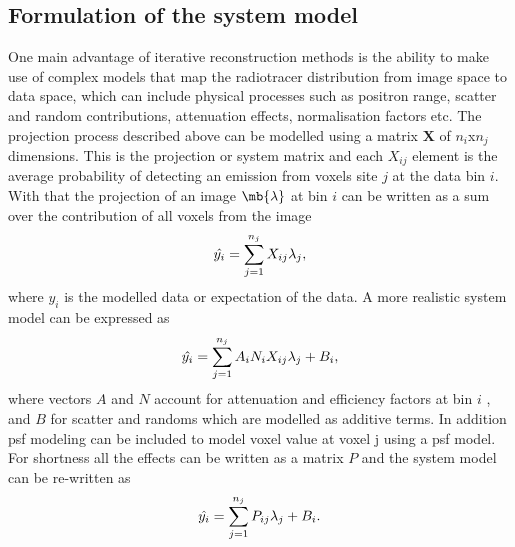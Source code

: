 \subsection{Formulation of the system model}
One main advantage of iterative reconstruction methods is the ability to make use of complex models that map the radiotracer distribution from image space to data space, which can include physical processes such as positron range, scatter and random contributions, attenuation effects, normalisation factors etc.
The projection process described above can be modelled using a matrix $\bm{X}$ of $n_i$x$n_j$ dimensions. This is the projection or system matrix and each ${X}_{ij}$ element is the average probability of detecting an emission from voxels site $j$ at the data bin $i$. With that the projection of an image $\mb{\lambda}$ at bin $i$ can be written as a sum over the contribution of all voxels from the image
\begin{equation}
   \hat{y_i} = \sum_{j=1}^{n_j} X_{ij} \lambda_j  \\,
\end{equation}
where $\hat{y_i}$ is the modelled data or expectation of the data.  A more realistic system model can be expressed as 
\begin{equation}
   \hat{y_i} = \sum_{j=1}^{n_j} A_{i}N_{i}X_{ij} \lambda_j + B_{i} \\,
\end{equation}
where vectors $A$ and $N$ account for attenuation and efficiency factors at bin $i$ , and $B$ for scatter and randoms which are modelled as additive terms. In addition \gls{psf} modeling can be included to model voxel value at voxel j using a \gls{psf} model. 
For shortness all the effects can be written as a matrix $P$ and the system model can be re-written as
\begin{equation}
   \hat{y_i} = \sum_{j=1}^{n_j} P_{ij} \lambda_j + B_{i} \\.
   \label{eqn:system_model}
\end{equation}

